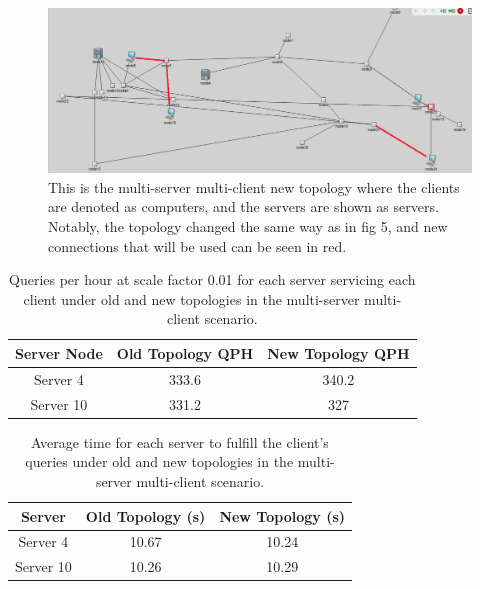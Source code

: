 \begin{figure}[tp]
\centering
\includegraphics[width=0.5 \textwidth]{figures/MultServerNew}
\caption{This is the multi-server multi-client new topology where the clients are denoted as computers, and the servers are shown as servers. Notably, the topology changed the same way as in fig 5, and new connections that will be used can be seen in red.
}
\end{figure}

\begin{table}[h!]
\centering
\begin{tabular}{|c|c|c|}
\hline
Server Node & Old Topology QPH & New Topology QPH \\ \hline
Server 4 & 333.6 & 340.2  \\ \hline
Server 10 & 331.2 & 327 \\ \hline
\end{tabular}
\caption{Queries per hour at scale factor 0.01 for each server servicing each client under old and new topologies in the multi-server multi-client scenario.}
\label{tab:my_label}
\end{table}

\begin{table}[h!]
\centering
\begin{tabular}{|c|c|c|}
\hline
Server & Old Topology (s) & New Topology (s) \\ \hline
Server 4 & 10.67 & 10.24  \\ \hline
Server 10 & 10.26 & 10.29 \\ \hline
\end{tabular}
\caption{Average time for each server to fulfill the client's queries under old and new topologies in the multi-server multi-client scenario.}
\label{tab:my_label}
\end{table}


